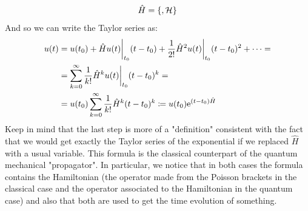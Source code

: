 \begin{equation}
  \hat{H} = \pb{}{\hamfun}
\end{equation}
And so we can write the Taylor series as:
\begin{equation}
  \begin{split}
    u(t) &= u(t_0) + \hat{H}u(t)\bigg|_{t_0} (t - t_0) + \frac{1}{2!} \hat{H}^2u(t)\bigg|_{t_0} (t - t_0)^2 + \dots =\\
    &= \displaystyle\sum_{k=0}^\infty \dfrac{1}{k!} \hat{H}^k u(t)\bigg|_{t_0}(t - t_0)^k =\\
    &= u(t_0)\displaystyle\sum_{k=0}^\infty \dfrac{1}{k!} \hat{H}^k (t - t_0)^k \coloneqq u(t_0) \mathrm{e}^{\left(t-t_0\right)\hat{H}}
  \end{split}
\end{equation}
Keep in mind that the last step is more of a "definition" consistent with the fact that we would get exactly the Taylor series of the exponential if we replaced $\hat{H}$ with a usual variable.
This formula is the classical counterpart of the quantum mechanical "propagator". In particular, we notice that in both cases the formula contains the Hamiltonian (the operator made from the Poisson brackets in the classical case and the operator associated to the Hamiltonian in the quantum case) and also that both are used to get the time evolution of something.
